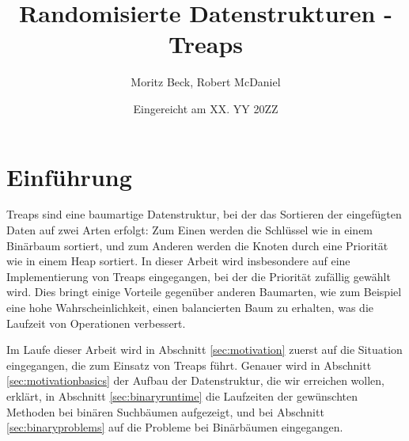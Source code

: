 \documentclass[a4paper]{scrreprt}
\theoremstyle{definition}
\begin{document}


\subject{Seminararbeit} %
\title{Randomisierte Datenstrukturen - Treaps} %
\author{Moritz Beck, Robert McDaniel} %
\date{Eingereicht am XX. YY 20ZZ} %
\titlehead{Julius-Maximilians-Universität Würzburg\\
Institut für Informatik\\
Lehrstuhl für Informatik I\\
Effiziente Algorithmen und wissensbasierte Systeme}
\publishers{Betreuer:\\
Prof.\ Dr.\ Alexander Wolff\\
Dipl.-Inf.\ Philipp Kindermann} %
\maketitle
\tableofcontents


\chapter{Einführung}
\label{sec:intro}

Treaps sind eine baumartige Datenstruktur, bei der das Sortieren der eingefügten Daten auf zwei Arten erfolgt:
Zum Einen werden die Schlüssel wie in einem Binärbaum sortiert, und zum Anderen werden die Knoten durch eine Priorität wie in einem Heap sortiert.
In dieser Arbeit wird insbesondere auf eine Implementierung von Treaps eingegangen, bei der die Priorität zufällig gewählt wird.
Dies bringt einige Vorteile gegenüber anderen Baumarten, wie zum Beispiel eine hohe Wahrscheinlichkeit, einen balancierten Baum zu erhalten, was die Laufzeit von Operationen verbessert.

Im Laufe dieser Arbeit wird in Abschnitt \ref{sec:motivation} zuerst auf die Situation eingegangen, die zum Einsatz von Treaps führt.
Genauer wird in Abschnitt \ref{sec:motivationbasics} der Aufbau der Datenstruktur, die wir erreichen wollen, erklärt, in Abschnitt \ref{sec:binaryruntime} die Laufzeiten der gewünschten Methoden bei binären Suchbäumen aufgezeigt, und bei Abschnitt \ref{sec:binaryproblems} auf die Probleme bei Binärbäumen eingegangen.
\end{document}
